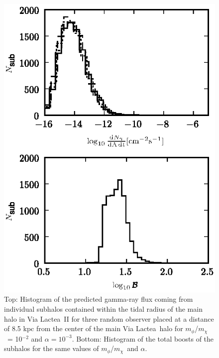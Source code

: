 \documentclass[aps,prd,twocolumn,amsmath,amssymb,floatfix,nofootinbib,10pt]{revtex4}
\newcommand{\VL}{Via Lactea}
\newcommand{\mdm}{\ensuremath{m_{\chi}}}
\newcommand{\mv}{\ensuremath{m_{\phi}}}
\begin{document}
\begin{figure}
\centering
\includegraphics{hist_-2_-3_10_2.eps}
\caption{Top: Histogram of the predicted gamma-ray flux coming from
individual subhalos contained within the tidal radius of the main halo
in \VL\ II for three random observer placed at a distance of 8.5 kpc
from the center of the main \VL\ halo for \mv/\mdm\ = 10$^{-2}$ and
$\alpha = 10^{-3}$. Bottom: Histogram of the total boosts of the
subhalos for the same values of \mv/\mdm\ and $\alpha$.}%
\label{fig:VL23_2}%
\end{figure}
\end{document}

